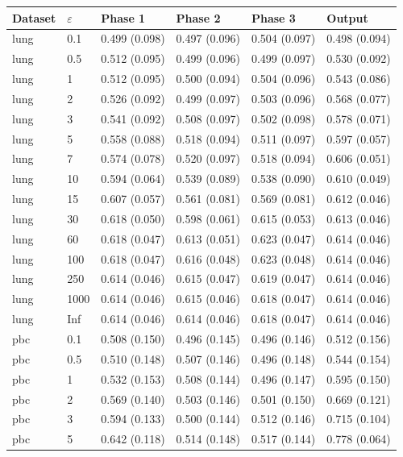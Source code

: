 \begin{tabular}{llllll}
  \toprule
Dataset & $\varepsilon$ & Phase 1 & Phase 2 & Phase 3 & Output \\ 
  \midrule
lung & 0.1 & 0.499 (0.098) & 0.497 (0.096) & 0.504 (0.097) & 0.498 (0.094) \\ 
  lung & 0.5 & 0.512 (0.095) & 0.499 (0.096) & 0.499 (0.097) & 0.530 (0.092) \\ 
  lung & 1 & 0.512 (0.095) & 0.500 (0.094) & 0.504 (0.096) & 0.543 (0.086) \\ 
  lung & 2 & 0.526 (0.092) & 0.499 (0.097) & 0.503 (0.096) & 0.568 (0.077) \\ 
  lung & 3 & 0.541 (0.092) & 0.508 (0.097) & 0.502 (0.098) & 0.578 (0.071) \\ 
  lung & 5 & 0.558 (0.088) & 0.518 (0.094) & 0.511 (0.097) & 0.597 (0.057) \\ 
  lung & 7 & 0.574 (0.078) & 0.520 (0.097) & 0.518 (0.094) & 0.606 (0.051) \\ 
  lung & 10 & 0.594 (0.064) & 0.539 (0.089) & 0.538 (0.090) & 0.610 (0.049) \\ 
  lung & 15 & 0.607 (0.057) & 0.561 (0.081) & 0.569 (0.081) & 0.612 (0.046) \\ 
  lung & 30 & 0.618 (0.050) & 0.598 (0.061) & 0.615 (0.053) & 0.613 (0.046) \\ 
  lung & 60 & 0.618 (0.047) & 0.613 (0.051) & 0.623 (0.047) & 0.614 (0.046) \\ 
  lung & 100 & 0.618 (0.047) & 0.616 (0.048) & 0.623 (0.048) & 0.614 (0.046) \\ 
  lung & 250 & 0.614 (0.046) & 0.615 (0.047) & 0.619 (0.047) & 0.614 (0.046) \\ 
  lung & 1000 & 0.614 (0.046) & 0.615 (0.046) & 0.618 (0.047) & 0.614 (0.046) \\ 
  lung & Inf & 0.614 (0.046) & 0.614 (0.046) & 0.618 (0.047) & 0.614 (0.046) \\ 
  pbc & 0.1 & 0.508 (0.150) & 0.496 (0.145) & 0.496 (0.146) & 0.512 (0.156) \\ 
  pbc & 0.5 & 0.510 (0.148) & 0.507 (0.146) & 0.496 (0.148) & 0.544 (0.154) \\ 
  pbc & 1 & 0.532 (0.153) & 0.508 (0.144) & 0.496 (0.147) & 0.595 (0.150) \\ 
  pbc & 2 & 0.569 (0.140) & 0.503 (0.146) & 0.501 (0.150) & 0.669 (0.121) \\ 
  pbc & 3 & 0.594 (0.133) & 0.500 (0.144) & 0.512 (0.146) & 0.715 (0.104) \\ 
  pbc & 5 & 0.642 (0.118) & 0.514 (0.148) & 0.517 (0.144) & 0.778 (0.064) \\ 

\end{tabular}
